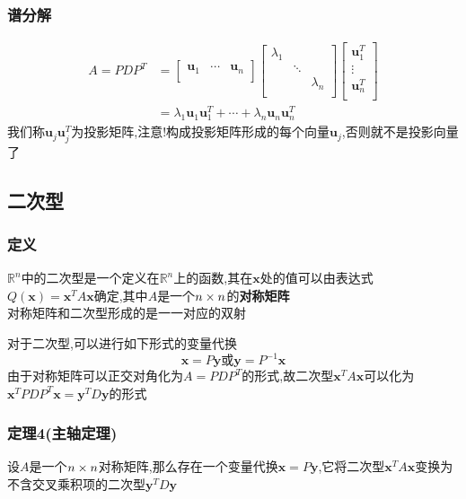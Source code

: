 \documentclass{article}
\newcommand{\RR}{\mathbb{R}}
\newcommand{\ve}{\boldsymbol}
\begin{document}
\begin{CJK}{UTF8}{gkai}
\subsubsection{谱分解}
\[
\begin{aligned}    
A = P D P^{T}&=
\begin{bmatrix}
    \ve{u}_1&\cdots&\ve{u}_n\\
\end{bmatrix}
\begin{bmatrix}
    \lambda_1&&\\
    &\ddots&\\
    &&\lambda_n\\
\end{bmatrix}
\begin{bmatrix}
    \ve{u}_1^T\\
    \vdots\\
    \ve{u}_n^T\\
\end{bmatrix}\\
&=\lambda_1\ve{u}_1 \ve{u}_1^T + \cdots + \lambda_n\ve{u}_n \ve{u}_n^T
\end{aligned}
\]
我们称$\ve{u}_j \ve{u}_j^T$为投影矩阵,注意!构成投影矩阵形成的每个向量$\ve{u}_j$,否则就不是投影向量了
\subsection{二次型}
\subsubsection{定义}
$\RR^n$中的二次型是一个定义在$\RR^n$上的函数,其在$\ve{x}$处的值可以由表达式$Q(\ve{x}) = \ve{x}^T A \ve{x}$确定,其中$A$是一个$n\times n$的\textbf{对称矩阵}\\

对称矩阵和二次型形成的是一一对应的双射

对于二次型,可以进行如下形式的变量代换
\[\ve{x} = P\ve{y} \text{或} \ve{y} = P^{-1} \ve{x}\]
由于对称矩阵可以正交对角化为$A = P D P^T$的形式,故二次型$\ve{x}^T A \ve{x}$可以化为$\ve{x}^T P D P^T \ve{x} = \ve{y}^T D\ve{y}$的形式\\

\subsubsection{定理4(主轴定理)}

设$A$是一个$n\times n$对称矩阵,那么存在一个变量代换$\ve{x} = P\ve{y}$,它将二次型$\ve{x}^T A \ve{x}$变换为不含交叉乘积项的二次型$\ve{y}^T D \ve{y}$\\


\end{CJK}
\end{document}
